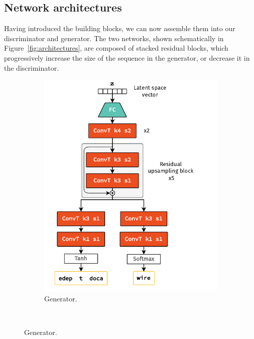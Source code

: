 \subsection{Network architectures}
Having introduced the building blocks, we can now assemble them into our
discriminator and generator. The two networks, shown schematically in
Figure~\ref{fig:architectures}, are composed of stacked residual blocks, which
progressively increase the size of the sequence in the generator, or decrease it
in the discriminator.

\begin{figure}
    \centering
    \begin{subfigure}[t]{0.49\textwidth}
        \centering
        \vspace{0.3cm}
        \includegraphics[width=\textwidth]{chapter4/network_architectures_gen.drawio.pdf}
        \hspace{-1cm} %
        \caption{Generator.}
    \end{subfigure}
    \\
    \vspace{0.5cm}

\end{figure}
